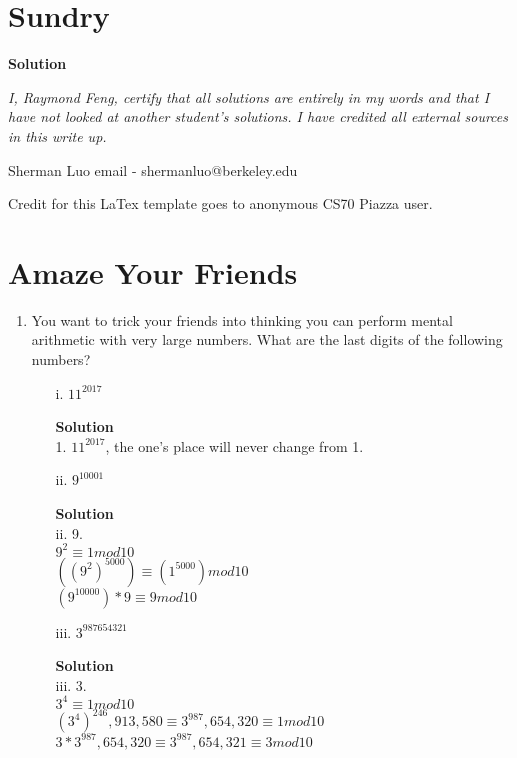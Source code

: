 \documentclass[11pt]{article}
\newcommand*{\Question}[1]{\section{#1}}
\newenvironment{Parts}{\begin{enumerate}[label=(\alph*)]}{\end{enumerate}}
\newcommand*{\Part}{\item}
\begin{document}
\Question{Sundry} 
\vspace{10pt}
\begin{mdframed} \textbf{Solution} 
\item \textit {I, Raymond Feng, certify that all solutions are entirely in my words and that I have not looked at another student's solutions. I have credited all external sources in this write up.}
\item Sherman Luo email - shermanluo@berkeley.edu
\item Credit for this LaTex template goes to anonymous CS70 Piazza user.
\end{mdframed}
\vfill\pagebreak[3]

\Question{Amaze Your Friends}
\begin{Parts}

\Part You want to trick your friends into thinking you can perform mental arithmetic with very large numbers.
What are the last digits of the following numbers?

\begin{enumerate}

\item[i.] \quad $11^{2017}$
\begin{mdframed} \textbf{Solution} \\
1. $11^{2017}$, the one's place will never change from 1. 
\end{mdframed}

\item[ii.] \quad $9^{10001}$
\begin{mdframed} \textbf{Solution} \\
ii. 9. \\
$9^2 \equiv 1mod10$ \\
$((9^2)^5000) \equiv (1^5000)mod10$ \\
$(9^10000)*9 \equiv 9mod10$ \\
\end{mdframed}

\item[iii.] \quad $3^{987654321}$
\begin{mdframed} \textbf{Solution} \\
iii. 3. \\
$3^4 \equiv 1mod10$ \\
$(3^4)^246,913,580 \equiv 3^987,654,320 \equiv 1mod10$ \\
$3*3^987,654,320 \equiv 3^987,654,321 \equiv 3mod10$ \\
\end{mdframed}
\end{enumerate}


\end{Parts}
\end{document}
